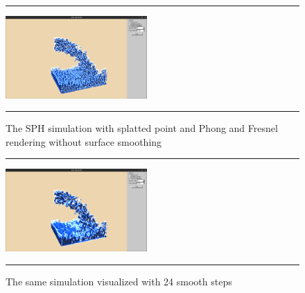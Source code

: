 \begin{figure}[!th]
\hrule
\begin{center}
\vspace*{2ex}\includegraphics[width=0.48\textwidth,clip=true,trim=10cm 1cm 10cm 5cm]{pictures/colors_unsmoothed.png}
\end{center}
\caption{The SPH simulation with splatted point and Phong and Fresnel rendering without surface smoothing}
\label{fig:res} 
\vspace*{2ex}
\hrule
\end{figure}

\begin{figure}[!th]
\hrule
\begin{center}
\vspace*{2ex}\includegraphics[width=0.48\textwidth,clip=true,trim=10cm 1cm 10cm 5cm]{pictures/colors_smoothed.png}
\end{center}
\caption{The same simulation visualized with 24 smooth steps}
\label{fig:res2} 
\vspace*{2ex}
\hrule
\end{figure}
